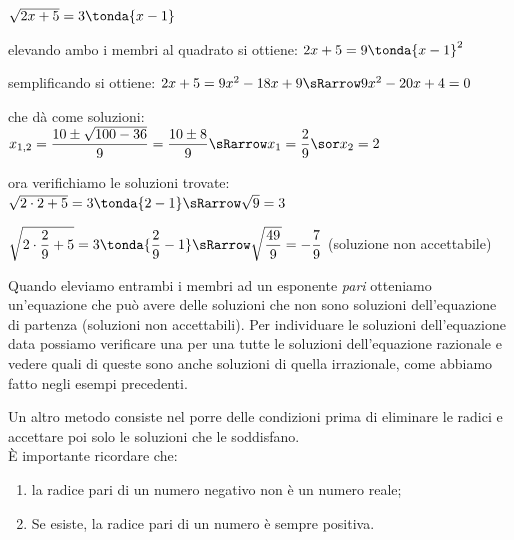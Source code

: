 \begin{esempio}
 \(\sqrt{2x+5} = 3 \tonda{x-1}\)
 
\vspace{4pt}
 
 elevando ambo i membri al quadrato si ottiene: \(2x+5 = 9\tonda{x-1}^2\)
 
 semplificando si ottiene: \(2x+5 = 9x^2-18x+9 \sRarrow 9x^2-20x+4=0\)
 
 che dà come soluzioni:
 \(x_{1,2} = \dfrac{10 \pm \sqrt{100-36}}{9} = \dfrac{10 \pm 8}{9} \sRarrow 
 x_1 = \dfrac{2}{9} \sor x_2 = 2\)
 
 ora verifichiamo le soluzioni trovate:
 \(\sqrt{2\cdot 2+5} = 3 \tonda{2-1} \sRarrow \sqrt{9} = 3\) 
 
 \(\sqrt{2\cdot \dfrac{2}{9}+5} = 3 \tonda{\dfrac{2}{9}-1} \sRarrow 
   \sqrt{\dfrac{49}{9}} = -\dfrac{7}{9}\) (soluzione non accettabile)
   
\end{esempio}


Quando eleviamo entrambi i membri ad un esponente \emph{pari} otteniamo 
un'equazione che può avere delle soluzioni che non sono soluzioni 
dell'equazione di partenza (soluzioni non accettabili). Per individuare le soluzioni dell'equazione data 
possiamo verificare una per una tutte le soluzioni dell'equazione razionale e 
vedere quali di queste sono anche soluzioni di quella irrazionale, come abbiamo 
fatto negli esempi precedenti.

\vspace{5pt}

Un altro metodo consiste nel porre delle condizioni prima di eliminare le radici 
e accettare poi solo le soluzioni che le soddisfano.\\

È importante ricordare che:
\begin{enumerate}
 \item la radice pari di un numero negativo non è un numero reale;
 \item Se esiste, la radice pari di un numero è sempre positiva.
\end{enumerate}

